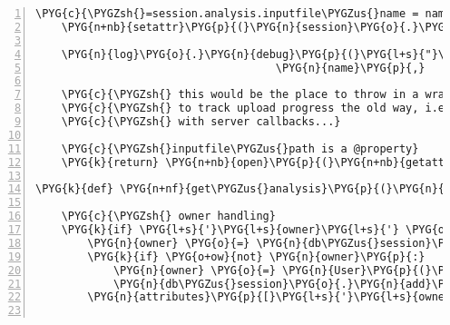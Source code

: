 \begin{Verbatim}[commandchars=\\\{\},numbers=left,firstnumber=1,stepnumber=5]
    \PYG{c}{\PYGZsh{}=session.analysis.inputfile\PYGZus{}name = name}
    \PYG{n+nb}{setattr}\PYG{p}{(}\PYG{n}{session}\PYG{o}{.}\PYG{n}{analysis}\PYG{p}{,} \PYG{n}{typename}\PYG{p}{,} \PYG{n}{name}\PYG{p}{)}

    \PYG{n}{log}\PYG{o}{.}\PYG{n}{debug}\PYG{p}{(}\PYG{l+s}{"}\PYG{l+s}{creating upload file }\PYG{l+s}{'}\PYG{l+s+si}{\PYGZpc{}s}\PYG{l+s}{'}\PYG{l+s}{ for analysis \PYGZsh{}}\PYG{l+s+si}{\PYGZpc{}d}\PYG{l+s}{"} \PYG{o}{\PYGZpc{}} \PYG{p}{(}
                                     \PYG{n}{name}\PYG{p}{,}             \PYG{n}{session}\PYG{o}{.}\PYG{n}{analysis}\PYG{o}{.}\PYG{n}{id}\PYG{p}{)}\PYG{p}{)}

    \PYG{c}{\PYGZsh{} this would be the place to throw in a wrapper}
    \PYG{c}{\PYGZsh{} to track upload progress the old way, i.e.}
    \PYG{c}{\PYGZsh{} with server callbacks...}

    \PYG{c}{\PYGZsh{}inputfile\PYGZus{}path is a @property}
    \PYG{k}{return} \PYG{n+nb}{open}\PYG{p}{(}\PYG{n+nb}{getattr}\PYG{p}{(}\PYG{n}{session}\PYG{o}{.}\PYG{n}{analysis}\PYG{p}{,} \PYG{n+nb}{type} \PYG{o}{+} \PYG{l+s}{'}\PYG{l+s}{\PYGZus{}path}\PYG{l+s}{'}\PYG{p}{)}\PYG{p}{,} \PYG{l+s}{"}\PYG{l+s}{w+b}\PYG{l+s}{"}\PYG{p}{)}

\PYG{k}{def} \PYG{n+nf}{get\PYGZus{}analysis}\PYG{p}{(}\PYG{n}{db\PYGZus{}session}\PYG{p}{,} \PYG{n}{attributes}\PYG{p}{)}\PYG{p}{:}

    \PYG{c}{\PYGZsh{} owner handling}
    \PYG{k}{if} \PYG{l+s}{'}\PYG{l+s}{owner}\PYG{l+s}{'} \PYG{o+ow}{not} \PYG{o+ow}{in} \PYG{n}{attributes}\PYG{p}{:}
        \PYG{n}{owner} \PYG{o}{=} \PYG{n}{db\PYGZus{}session}\PYG{o}{.}\PYG{n}{query}\PYG{p}{(}\PYG{n}{User}\PYG{p}{)}\PYG{o}{.}\PYG{n}{get}\PYG{p}{(}\PYG{l+s}{"}\PYG{l+s}{anonymous}\PYG{l+s}{"}\PYG{p}{)}
        \PYG{k}{if} \PYG{o+ow}{not} \PYG{n}{owner}\PYG{p}{:}
            \PYG{n}{owner} \PYG{o}{=} \PYG{n}{User}\PYG{p}{(}\PYG{l+s}{"}\PYG{l+s}{anonymous}\PYG{l+s}{"}\PYG{p}{)}
            \PYG{n}{db\PYGZus{}session}\PYG{o}{.}\PYG{n}{add}\PYG{p}{(}\PYG{n}{owner}\PYG{p}{)}
        \PYG{n}{attributes}\PYG{p}{[}\PYG{l+s}{'}\PYG{l+s}{owner}\PYG{l+s}{'}\PYG{p}{]} \PYG{o}{=} \PYG{n}{owner}


\end{Verbatim}
